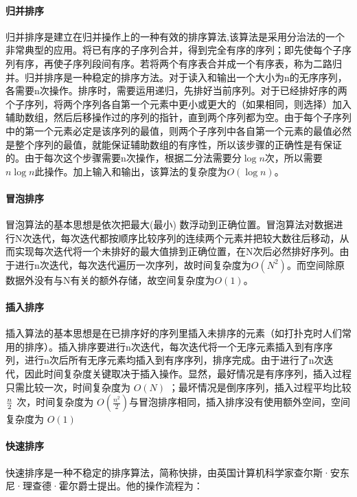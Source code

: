 \documentclass[UTF8]{ctexart}
\begin{document}
\paragraph{归并排序}
归并排序\cite{cormen1990introduction}是建立在归并操作上的一种有效的排序算法,该算法是采用分治法的一个非常典型的应用。将已有序的子序列合并，得到完全有序的序列；即先使每个子序列有序，再使子序列段间有序。若将两个有序表合并成一个有序表，称为二路归并。归并排序是一种稳定的排序方法。对于读入和输出一个大小为n的无序序列，各需要n次操作。排序时，需要运用递归，先排好当前序列。对于已经排好序的两个子序列，将两个序列各自第一个元素中更小或更大的（如果相同，则选择）加入辅助数组，然后后移操作过的序列的指针，直到两个序列都为空。由于每个子序列中的第一个元素必定是该序列的最值，则两个子序列中各自第一个元素的最值必然是整个序列的最值，就能保证辅助数组的有序性，所以该步骤的正确性是有保证的。由于每次这个步骤需要n次操作，根据二分法需要分$\log n$次，所以需要$n \log n$此操作。加上输入和输出，该算法的复杂度为$O(\log n)$。

\paragraph{冒泡排序}
冒泡算法\cite{cormen1990introduction}的基本思想是依次把最大(最小) 数浮动到正确位置。冒泡算法对数据进行N次迭代，每次迭代都按顺序比较序列的连续两个元素并把较大数往后移动，从而实现每次迭代将一个未排好的最大值排到正确位置，在N次后必然排好序列。由于进行n次迭代，每次迭代遍历一次序列，故时间复杂度为$O(N^2)$。而空间除原数据外没有与N有关的额外存储，故空间复杂度为$O(1)$。

\paragraph{插入排序}
插入算法的基本思想是在已排序好的序列里插入未排序的元素（如打扑克时人们常用的排序）。插入排序\cite{cormen1990introduction}要进行n次迭代，每次迭代将一个无序元素插入到有序序列，进行n次后所有无序元素均插入到有序序列，排序完成。由于进行了n次迭代，因此时间复杂度关键取决于插入操作。显然，最好情况是有序序列，插入过程只需比较一次，时间复杂度为 $O(N)$ ；最坏情况是倒序序列，插入过程平均比较 $n \over 2$ 次，时间复杂度为 $O(\frac{n^2}{2})$与冒泡排序相同，插入排序没有使用额外空间，空间复杂度为 $O(1)$

\paragraph{快速排序}
快速排序\cite{cormen1990introduction}是一种不稳定的排序算法，简称快排，由英国计算机科学家查尔斯·安东尼·理查德·霍尔爵士提出。他的操作流程为：
\end{document}
